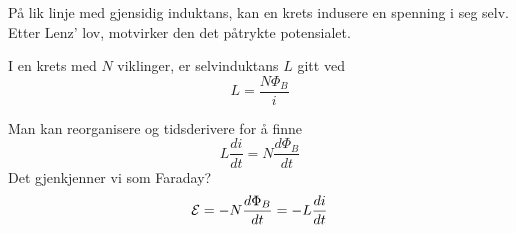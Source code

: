 På lik linje med gjensidig induktans,
kan en krets indusere en spenning i seg selv.
Etter Lenz' lov, motvirker den det påtrykte potensialet.

I en krets med $N$ viklinger, er selvinduktans $L$ gitt ved
$$L = \frac{N\Phi_B}{i}$$

Man kan reorganisere og tidsderivere for å finne
$$L\frac{di}{dt} = N\frac{d\Phi_B}{dt}$$
Det gjenkjenner vi som Faraday?
$$\mathcal{E} = -N\frac{d\Phi_B}{dt}
  = -L\frac{di}{dt}$$
